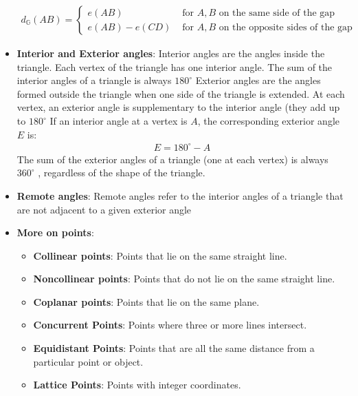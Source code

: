 \documentclass{report}
\begin{document}
\begin{itemize}
\begin{align*}
                d_{\mathbb{G}}(AB) = \begin{cases}
                    e(AB) & \text{ for $A,B$ on the same side of the gap} \\     
                    e(AB) - e(CD) & \text{ for $A,B$ on the opposite sides of the gap} 
                \end{cases}
            \end{align*}
        \item \textbf{Interior and Exterior angles}: Interior angles are the angles inside the triangle. Each vertex of the triangle has one interior angle. The sum of the interior angles of a triangle is always $180^{\circ}$
            \bigbreak \noindent 
            Exterior angles are the angles formed outside the triangle when one side of the triangle is extended.
            At each vertex, an exterior angle is supplementary to the interior angle (they add up to $180^{\circ} $
            \bigbreak \noindent 
            If an interior angle at a vertex is $A$, the corresponding exterior angle $E$ is:
            \begin{align*}
                E = 180^{\circ} - A
            \end{align*}
            \bigbreak \noindent 
            The sum of the exterior angles of a triangle (one at each vertex) is always $360^{\circ}$ , regardless of the shape of the triangle.
            \bigbreak \noindent 
        \item \textbf{Remote angles}: Remote angles refer to the interior angles of a triangle that are not adjacent to a given exterior angle
        \item \textbf{More on points}:
            \begin{itemize}
                \item \textbf{Collinear points}: Points that lie on the same straight line.
                \item \textbf{Noncollinear points}: Points that do not lie on the same straight line.
                \item \textbf{Coplanar points}: Points that lie on the same plane.
                \item \textbf{Concurrent Points}: Points where three or more lines intersect.
                \item \textbf{Equidistant Points}: Points that are all the same distance from a particular point or object.
                \item \textbf{Lattice Points}:  Points with integer coordinates.

\end{itemize}
\end{itemize}
\end{document}
